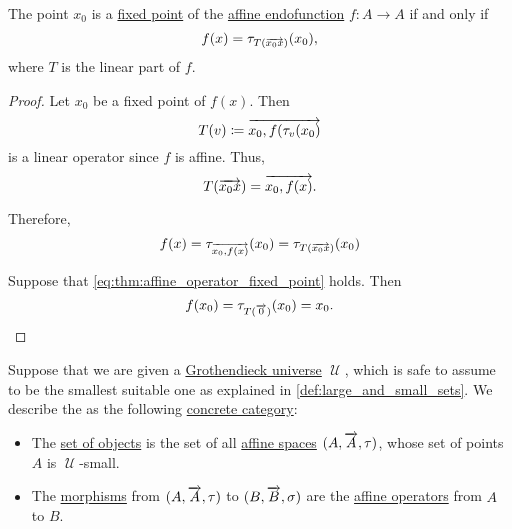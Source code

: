 \begin{proposition}\label{thm:affine_operator_fixed_point}
  The point \( x_0 \) is a \hyperref[def:function_fixed_point]{fixed point} of the \hyperref[def:affine_operator]{affine endofunction} \( f: A \to A \) if and only if
  \begin{equation}\label{eq:thm:affine_operator_fixed_point}
    f(x) = \tau_{T(\overrightarrow{x_0 x})}(x_0),
  \end{equation}
  where \( T \) is the linear part of \( f \).
\end{proposition}
\begin{proof}
  \SufficiencySubProof Let \( x_0 \) be a fixed point of \( f(x) \). Then
  \begin{equation*}
    T(v) \coloneqq \overrightarrow{x_0,f(\tau_v(x_0)}
  \end{equation*}
  is a linear operator since \( f \) is affine. Thus,
  \begin{equation*}
    T(\overrightarrow{x_0 x}) = \overrightarrow{x_0,f(x)}.
  \end{equation*}

  Therefore,
  \begin{equation*}
    f(x) = \tau_{\overrightarrow{x_0,f(x)}}(x_0) = \tau_{T(\overrightarrow{x_0 x})}(x_0)
  \end{equation*}

  \NecessitySubProof Suppose that \eqref{eq:thm:affine_operator_fixed_point} holds. Then
  \begin{equation*}
    f(x_0) = \tau_{T(\overrightarrow{0})}(x_0) = x_0.
  \end{equation*}
\end{proof}

\begin{definition}\label{def:category_of_small_affine_spaces}
  Suppose that we are given a \hyperref[def:grothendieck_universe]{Grothendieck universe} \( \mscrU \), which is safe to assume to be the smallest suitable one as explained in \cref{def:large_and_small_sets}. We describe the  as the following \hyperref[rem:concrete_categories]{concrete category}:

  \begin{itemize}
    \item The \hyperref[def:category/objects]{set of objects} is the set of all \hyperref[def:affine_space]{affine spaces} \( (A, \overrightarrow{A}, \tau) \), whose set of points \( A \) is \( \mscrU \)-small.

    \item The \hyperref[def:category/morphisms]{morphisms} from \( (A, \overrightarrow{A}, \tau) \) to \( (B, \overrightarrow{B}, \sigma) \) are the \hyperref[def:affine_operator]{affine operators} from \( A \) to \( B \).
  \end{itemize}
\end{definition}

